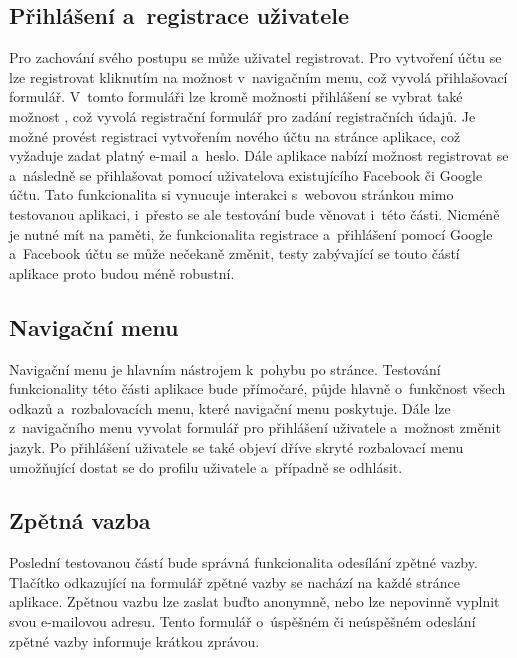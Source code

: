 \documentclass[
    color,   %
	table,   %
    twoside, %
    nolot, nolof,
]{fithesis3}
\begin{document}
\subsection{Přihlášení a~registrace uživatele}
Pro zachování svého postupu se může uživatel registrovat. Pro vytvoření účtu se lze registrovat kliknutím na možnost  v~navigačním menu, což vyvolá přihlašovací formulář. V~tomto formuláři lze kromě možnosti přihlášení se vybrat také možnost , což vyvolá registrační formulář pro zadání registračních údajů. Je možné provést registraci vytvořením nového účtu na stránce aplikace, což vyžaduje zadat platný e-mail a~heslo. Dále aplikace nabízí možnost registrovat se a~následně se přihlašovat pomocí uživatelova existujícího Facebook či Google účtu. Tato funkcionalita si vynucuje interakci s~webovou stránkou mimo testovanou aplikaci, i~přesto se ale testování bude věnovat i~této části. Nicméně je nutné mít na paměti, že funkcionalita registrace a~přihlášení pomocí Google a~Facebook účtu se může nečekaně změnit, testy zabývající se touto částí aplikace proto budou méně robustní.

\subsection{Navigační menu}
Navigační menu je hlavním nástrojem k~pohybu po stránce. Testování funkcionality této části aplikace bude přímočaré, půjde hlavně o~funkčnost všech odkazů a~rozbalovacích menu, které navigační menu poskytuje. Dále lze z~navigačního menu vyvolat formulář pro přihlášení uživatele a~možnost změnit jazyk. Po přihlášení uživatele se také objeví dříve skryté rozbalovací menu umožňující dostat se do profilu uživatele a~případně se odhlásit.

\subsection{Zpětná vazba}
Poslední testovanou částí bude správná funkcionalita odesílání zpětné vazby. Tlačítko odkazující na formulář zpětné vazby se nachází na každé stránce aplikace. Zpětnou vazbu lze zaslat buďto anonymně, nebo lze nepovinně vyplnit svou e-mailovou adresu. Tento formulář o~úspěšném či neúspěšném odeslání zpětné vazby informuje krátkou zprávou.
\end{document}
